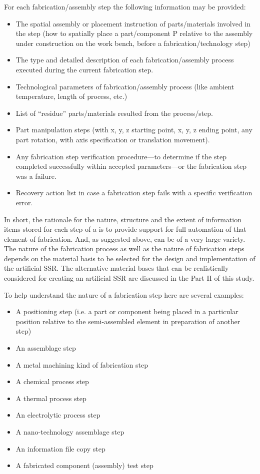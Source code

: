 For each fabrication/assembly step the following information may be
provided:

\begin{itemize}
\item The spatial assembly or placement instruction of parts/materials
involved in the step (how to spatially place a part/component P
relative to the assembly under construction on the work bench, before a
fabrication/technology step)
\item The type and detailed description of each fabrication/assembly
process executed during the current fabrication step.
\item Technological parameters of fabrication/assembly process (like
ambient temperature, length of process, etc.)
\item List of “residue” parts/materials resulted from the process/step.
\item Part manipulation steps (with x, y, z starting point, x, y, z
ending point, any part rotation, with axis specification or translation
movement).
\item Any fabrication step verification procedure---to determine if the
step completed successfully within accepted parameters---or the
fabrication step was a failure.
\item Recovery action list in case a fabrication step fails with a
specific verification error.
\end{itemize}

In short, the rationale for the nature, structure and the extent of
information items stored for each step of a  
is to provide support for full automation of that element of
fabrication. And, as suggested above,  can be
of a very large variety. The nature of the fabrication process as well
as the nature of fabrication steps depends on the material basis to be
selected for the design and implementation of the artificial SSR. The
alternative material bases that can be realistically considered for
creating an artificial SSR are discussed in the Part II of this study.

To help understand the nature of a fabrication step here are several
examples:

\begin{itemize}
\item A positioning step (i.e. a part or component being placed in a particular position relative
to the semi-assembled element in preparation of another step)
\item An assemblage step
\item A metal machining kind of fabrication step
\item A chemical process step
\item A thermal process step
\item An electrolytic process step
\item A nano-technology assemblage step
\item An information file copy step
\item A fabricated component (assembly) test step
\end{itemize}

